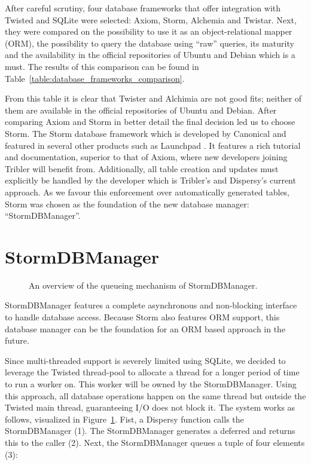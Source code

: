 After careful scrutiny, four database frameworks that offer integration with Twisted and SQLite were selected: Axiom, Storm, Alchemia and Twistar.
Next, they were compared on the possibility to use it as an object-relational mapper (ORM), the possibility to query the database using \enquote{raw} queries, its maturity and the availability in the official repositories of Ubuntu and Debian which is a must.
The results of this comparison can be found in Table~\ref{table:database_frameworks_comparison}.

From this table it is clear that Twister and Alchimia are not good fits; neither of them are available in the official repositories of Ubuntu and Debian.
After comparing Axiom and Storm in better detail the final decision led us to choose Storm.
The Storm database framework which is developed by Canonical and featured in several other products such as Launchpad \cite{canonical2011storm}.
It features a rich tutorial and documentation, superior to that of Axiom, where new developers joining Tribler will benefit from.
Additionally, all table creation and updates must explicitly be handled by the developer which is Tribler's and Dispersy's current approach.
As we favour this enforcement over automatically generated tables, Storm was chosen as the foundation of the new database manager: \enquote{StormDBManager}.

\section{StormDBManager}

\begin{figure}[h]
	\caption{An overview of the queueing mechanism of StormDBManager.}
	\label{fig:storm_db_worker}
\end{figure}

StormDBManager features a complete asynchronous and non-blocking interface to handle database access.
Because Storm also features ORM support, this database manager can be the foundation for an ORM based approach in the future.

Since multi-threaded support is severely limited using SQLite, we decided to leverage the Twisted thread-pool to allocate a thread for a longer period of time to run a worker on.
This worker will be owned by the StormDBManager.
Using this approach, all database operations happen on the same thread but outside the Twisted main thread, guaranteeing I/O does not block it.
The system works as follows, visualized in Figure~\ref{fig:storm_db_worker}.
Fist, a Dispersy function calls the StormDBManager (1).
The StormDBManager generates a deferred and returns this to the caller (2).
Next, the StormDBManager queues a tuple of four elements (3):

